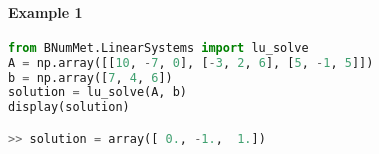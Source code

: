 \paragraph{Example 1}{
\begin{lstlisting}[language=Python]
from BNumMet.LinearSystems import lu_solve
A = np.array([[10, -7, 0], [-3, 2, 6], [5, -1, 5]])
b = np.array([7, 4, 6])
solution = lu_solve(A, b)
display(solution)

>> solution = array([ 0., -1.,  1.])
\end{lstlisting}
}